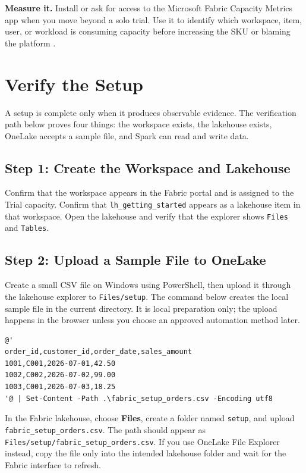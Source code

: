 \begin{tipbox}
\textbf{Measure it.} Install or ask for access to the Microsoft Fabric Capacity Metrics app when you move beyond a solo trial. Use it to identify which workspace, item, user, or workload is consuming capacity before increasing the SKU or blaming the platform \cite{microsoftFabricMetricsApp}.
\end{tipbox}

\section{Verify the Setup}
A setup is complete only when it produces observable evidence. The verification path below proves four things: the workspace exists, the lakehouse exists, OneLake accepts a sample file, and Spark can read and write data.

\subsection{Step 1: Create the Workspace and Lakehouse}
Confirm that the workspace appears in the Fabric portal and is assigned to the Trial capacity. Confirm that \texttt{lh\_getting\_started} appears as a lakehouse item in that workspace. Open the lakehouse and verify that the explorer shows \texttt{Files} and \texttt{Tables}.

\subsection{Step 2: Upload a Sample File to OneLake}
Create a small CSV file on Windows using PowerShell, then upload it through the lakehouse explorer to \texttt{Files/setup}. The command below creates the local sample file in the current directory. It is local preparation only; the upload happens in the browser unless you choose an approved automation method later.

\begin{lstlisting}[language={},caption={PowerShell command to create a small CSV sample file on Windows.}]
@'
order_id,customer_id,order_date,sales_amount
1001,C001,2026-07-01,42.50
1002,C002,2026-07-02,99.00
1003,C001,2026-07-03,18.25
'@ | Set-Content -Path .\fabric_setup_orders.csv -Encoding utf8
\end{lstlisting}

In the Fabric lakehouse, choose \textbf{Files}, create a folder named \texttt{setup}, and upload \texttt{fabric\_setup\_orders.csv}. The path should appear as \texttt{Files/setup/fabric\_setup\_orders.csv}. If you use OneLake File Explorer instead, copy the file only into the intended lakehouse folder and wait for the Fabric interface to refresh.

